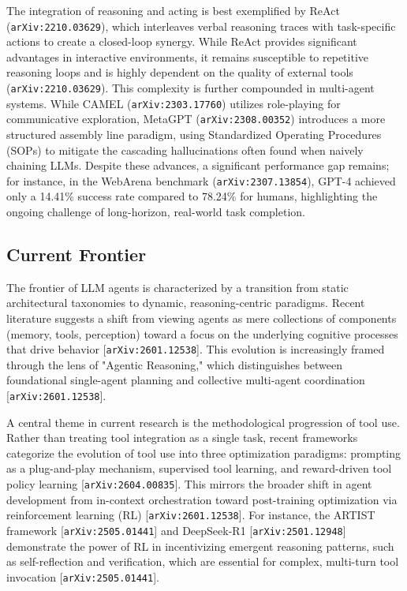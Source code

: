 \documentclass[11pt]{article}
\begin{document}
The integration of reasoning and acting is best exemplified by ReAct (\texttt{arXiv:2210.03629}), which interleaves verbal reasoning traces with task-specific actions to create a closed-loop synergy. While ReAct provides significant advantages in interactive environments, it remains susceptible to repetitive reasoning loops and is highly dependent on the quality of external tools (\texttt{arXiv:2210.03629}). This complexity is further compounded in multi-agent systems. While CAMEL (\texttt{arXiv:2303.17760}) utilizes role-playing for communicative exploration, MetaGPT (\texttt{arXiv:2308.00352}) introduces a more structured assembly line paradigm, using Standardized Operating Procedures (SOPs) to mitigate the cascading hallucinations often found when naively chaining LLMs. Despite these advances, a significant performance gap remains; for instance, in the WebArena benchmark (\texttt{arXiv:2307.13854}), GPT-4 achieved only a 14.41\% success rate compared to 78.24\% for humans, highlighting the ongoing challenge of long-horizon, real-world task completion.

\subsection{Current Frontier}

The frontier of LLM agents is characterized by a transition from static architectural taxonomies to dynamic, reasoning-centric paradigms. Recent literature suggests a shift from viewing agents as mere collections of components (memory, tools, perception) toward a focus on the underlying cognitive processes that drive behavior [\texttt{arXiv:2601.12538}]. This evolution is increasingly framed through the lens of "Agentic Reasoning," which distinguishes between foundational single-agent planning and collective multi-agent coordination [\texttt{arXiv:2601.12538}].

A central theme in current research is the methodological progression of tool use. Rather than treating tool integration as a single task, recent frameworks categorize the evolution of tool use into three optimization paradigms: prompting as a plug-and-play mechanism, supervised tool learning, and reward-driven tool policy learning [\texttt{arXiv:2604.00835}]. This mirrors the broader shift in agent development from in-context orchestration toward post-training optimization via reinforcement learning (RL) [\texttt{arXiv:2601.12538}]. For instance, the ARTIST framework [\texttt{arXiv:2505.01441}] and DeepSeek-R1 [\texttt{arXiv:2501.12948}] demonstrate the power of RL in incentivizing emergent reasoning patterns, such as self-reflection and verification, which are essential for complex, multi-turn tool invocation [\texttt{arXiv:2505.01441}].
\end{document}
